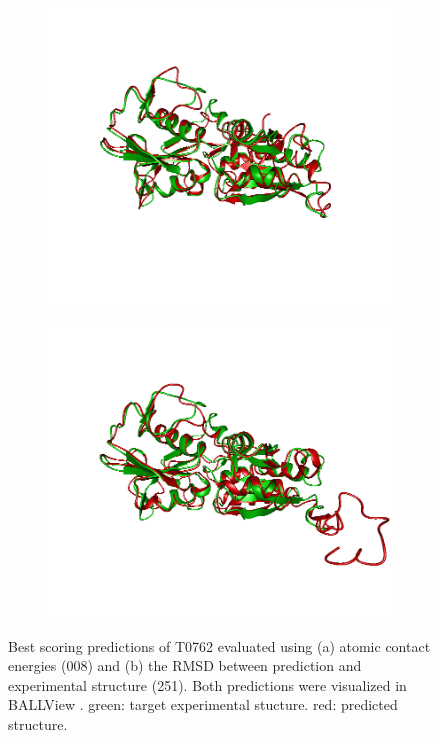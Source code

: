 \documentclass[11pt,a4paper]{article}
\renewcommand{\(}{\left (}
\renewcommand{\)}{\right )}
\begin{document}
\begin{figure}[!h]
	\begin{subfigure}{.5\textwidth}
		\includegraphics[width=\textwidth]{figures/T0762TS008}
		\subcaption{}
	\end{subfigure}
	\begin{subfigure}{.5\textwidth}
		\includegraphics[width=\textwidth]{figures/T0762TS251}
		\subcaption{}
	\end{subfigure}
	 \caption{Best scoring predictions of T0762 evaluated using (a) atomic contact energies (008) and (b) the RMSD between prediction and experimental structure (251). Both predictions were visualized in BALLView \citep{ballview}. green: target experimental stucture. red: predicted structure.}
	\label{T0762}
\end{figure}
\end{document}
